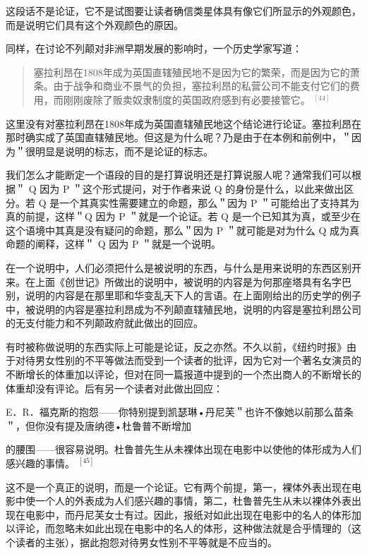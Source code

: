这段话不是论证，它不是试图要让读者确信类星体具有像它们所显示的外观颜色，而是说明它们具有这个外观颜色的原因。

同样，在讨论不列颠对非洲早期发展的影响时，一个历史学家写道：

\begin{abstract}
塞拉利昂在1808年成为英国直辖殖民地不是因为它的繁荣，而是因为它的萧条。由于战争和商业不景气的负担，塞拉利昂的私营公司不能支付它们的费用，而刚刚废除了贩卖奴隶制度的英国政府感到有必要接管它。 ${ }^{[44]}$
\end{abstract}

这里没有对塞拉利昂在1808年成为英国直辖殖民地这个结论进行论证。塞拉利昂在那时确实成了英国直辖殖民地。但这是为什么呢？乃是由于在本例和前例中，＂因为＂很明显是说明的标志，而不是论证的标志。

我们怎么才能断定一个语段的目的是打算说明还是打算说服人呢？通常我们可以根据＂ Q 因为 P ＂这个形式提问，对于作者来说 Q 的身份是什么，以此来做出区分。若 Q 是一个其真实性需要建立的命题，那么＂因为 P ＂可能给出了支持其为真的前提，这样＂Q 因为 P ＂就是一个论证。若 Q 是一个已知其为真，或至少在这个语境中其真是没有疑问的命题，那么＂因为 P ＂就可能是对为什么 Q 成为真命题的阐释，这样＂ Q 因为 P ＂就是一个说明。

在一个说明中，人们必须把什么是被说明的东西，与什么是用来说明的东西区别开来。在上面《创世记》所做出的说明中，被说明的内容是为何那座塔具有名字巴别，说明的内容是在那里耶和华变乱天下人的言语。在上面刚给出的历史学的例子中，被说明的内容是塞拉利昂成为不列颠直辖殖民地，说明的内容是塞拉利昂公司的无支付能力和不列颠政府就此做出的回应。

有时被称做说明的东西实际上可能是论证，反之亦然。不久以前，《纽约时报》由于对待男女性别的不平等做法而受到一个读者的批评，因为它对一个著名女演员的不断增长的体重加以评论，但对在同一篇报道中提到的一个杰出商人的不断增长的体重却没有评论。后有另一个读者对此做出回应：

E．R．福克斯的抱怨——你特别提到凯瑟琳•丹尼芙＂也许不像她以前那么苗条＂，但你没有提及唐纳德•杜鲁普不断增加

的腰围——很容易说明。杜鲁普先生从未裸体出现在电影中以使他的体形成为人们感兴趣的事情。 ${ }^{[45]}$

这不是一个真正的说明，而是一个论证。它有两个前提，第一，裸体外表出现在电影中使一个人的外表成为人们感兴趣的事情，第二，杜鲁普先生从未以裸体外表出现在电影中，而丹尼芙女士有过。因此，报纸对如此出现在电影中的名人的体形加以评论，而忽略未如此出现在电影中的名人的体形，这种做法就是合乎情理的（这个读者的主张），据此抱怨对待男女性别不平等就是不应当的。

